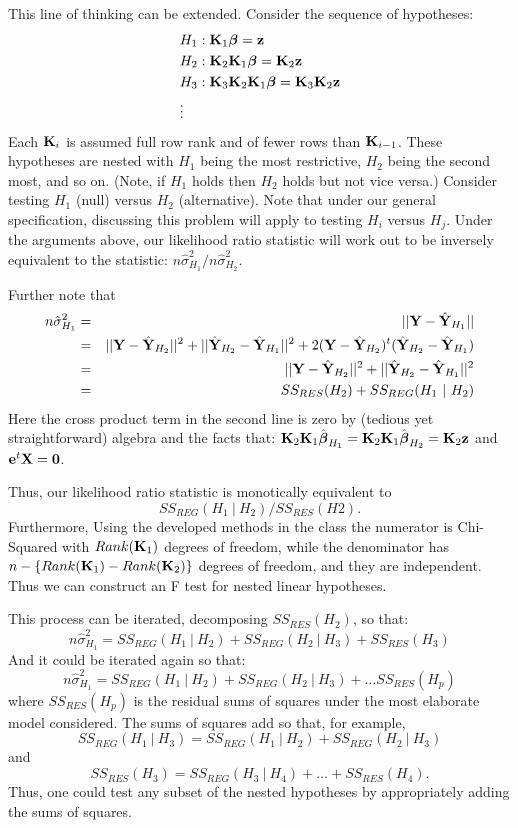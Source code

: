 This line of thinking can be extended. Consider the sequence of hypotheses:
\begin{align*}
 & H_1 :\mathbf{K}_1 \boldsymbol{\beta} = \mathbf{z} \\
 & H_2 :\mathbf{K}_2 \mathbf{K}_1 \boldsymbol{\beta} = \mathbf{K}_2 \mathbf{z} \\
 & H_3 :\mathbf{K}_3 \mathbf{K}_2 \mathbf{K}_1 \boldsymbol{\beta} = \mathbf{K}_3 \mathbf{K}_2 \mathbf{z} \\
 & \vdots 
\end{align*}
Each $\mathbf{K}_i$ is assumed full row rank and of fewer rows than $\mathbf{K}_{i-1}$. 
These hypotheses are nested with $H_1$ being the most restrictive, $H_2$ being the
second most, and so on. (Note, if $H_1$ holds then $H_2$ holds but not vice versa.)
Consider
testing $H_{1}$ (null) versus $H_{2}$ (alternative). Note that under our
general specification, discussing this problem will apply to testing $H_i$ versus $H_j$. 
Under the arguments
above, our likelihood ratio statistic will work out to be inversely equivalent to
the statistic: $n\hat \sigma^2_{H_1} / n\hat \sigma^2_{H_2}$. 


Further note that
\begin{eqnarray*}
n\hat \sigma^2_{H_1}
& = &||\mathbf{Y} - \hat {\mathbf{Y}}_{H_1}|| \\
& = & ||\mathbf{Y} - \hat {\mathbf{Y}}_{H_2}||^2  + ||\hat {\mathbf{Y}}_{H_2} - \hat {\mathbf{Y}}_{H_1}||^2
+ 2 (\mathbf{Y} - \hat {\mathbf{Y}}_{H_2})^t (\hat {\mathbf{Y}}_{H_2} - \hat {\mathbf{Y}}_{H_1}) \\
& = & ||\mathbf{Y} - \hat {\mathbf{Y}}_{H_2}||^2  + ||\hat {\mathbf{Y}}_{H_2} - \hat {\mathbf{Y}}_{H_1}||^2 \\
& = & SS_{RES}(H_2) + SS_{REG}(H_1 ~|~ H_2)
\end{eqnarray*}
Here the cross product term in the second line is zero by (tedious yet straightforward) algebra
and the facts that:
$\mathbf{K}_2 \mathbf{K}_1 \hat {\boldsymbol{\beta}}_{H_1} = \mathbf{K}_2 \mathbf{K}_1 \hat {\boldsymbol{\beta}}_{H_2} = \mathbf{K}_2 \mathbf{z}$ and $\mathbf{e}^t \mathbf{X} = \mathbf{0}$. 

Thus, our likelihood ratio statistic is monotically equivalent to
$$SS_{REG}(H_1 ~|~ H_2) / SS_{RES}(H2).$$
Furthermore,
Using the developed methods in the class the numerator is Chi-Squared with
$Rank(\mathbf{K}_1)$ degrees of freedom, while the denominator has $n - \{Rank(\mathbf{K}_1) - Rank(\mathbf{K}_2)\}$ 
degrees of freedom, and they are independent. Thus we can construct an F test for nested
linear hypotheses.

This process can be iterated, decomposing $SS_{RES}(H_2)$, so that:
$$
n\hat \sigma^2_{H_1}
= SS_{REG}(H_1 ~|~ H_2) + SS_{REG}(H_2 ~|~ H_3) + SS_{RES}(H_3)
$$
And it could be iterated again so that:
$$
n\hat \sigma^2_{H_1}
= SS_{REG}(H_1 ~|~ H_2) + SS_{REG}(H_2 ~|~ H_3) + \ldots SS_{RES}(H_p)
$$
where $SS_{RES}(H_p)$ is the residual sums of squares under the most elaborate model considered.
The sums of squares add so that, for example,
$$
SS_{REG}(H_1 ~|~ H_3) = SS_{REG}(H_1 ~|~ H_2) + SS_{REG}(H_2 ~|~ H_3)
$$
and
$$
SS_{RES}(H_3) = SS_{REG}(H_3 ~|~ H_4) + \ldots + SS_{RES}(H_4).
$$
Thus, one could test any subset of the nested hypotheses by appropriately adding the sums of
squares.

